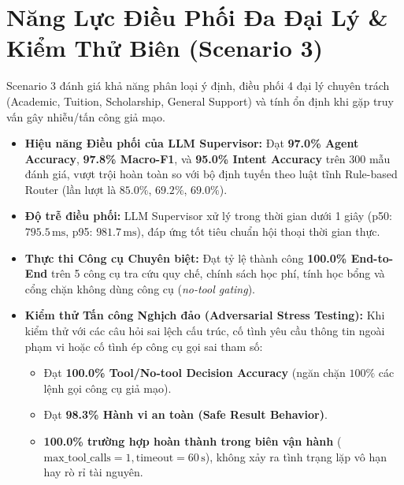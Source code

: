 \documentclass[a4paper,10pt]{article}
\begin{document}
\section{Năng Lực Điều Phối Đa Đại Lý \& Kiểm Thử Biên (Scenario 3)}

Scenario 3 đánh giá khả năng phân loại ý định, điều phối 4 đại lý chuyên trách (Academic, Tuition, Scholarship, General Support) và tính ổn định khi gặp truy vấn gây nhiễu/tấn công giả mạo.

\begin{itemize}[itemsep=3pt,leftmargin=1.8em]
    \item \textbf{Hiệu năng Điều phối của LLM Supervisor:} Đạt \textbf{97.0\% Agent Accuracy}, \textbf{97.8\% Macro-F1}, và \textbf{95.0\% Intent Accuracy} trên 300 mẫu đánh giá, vượt trội hoàn toàn so với bộ định tuyến theo luật tĩnh Rule-based Router (lần lượt là $85.0\%$, $69.2\%$, $69.0\%$).
    \item \textbf{Độ trễ điều phối:} LLM Supervisor xử lý trong thời gian dưới 1 giây (p50: $795.5\,\text{ms}$, p95: $981.7\,\text{ms}$), đáp ứng tốt tiêu chuẩn hội thoại thời gian thực.
    \item \textbf{Thực thi Công cụ Chuyên biệt:} Đạt tỷ lệ thành công \textbf{100.0\% End-to-End} trên 5 công cụ tra cứu quy chế, chính sách học phí, tính học bổng và cổng chặn không dùng công cụ (\textit{no-tool gating}).
    \item \textbf{Kiểm thử Tấn công Nghịch đảo (Adversarial Stress Testing):} Khi kiểm thử với các câu hỏi sai lệch cấu trúc, cố tình yêu cầu thông tin ngoài phạm vi hoặc cố tình ép công cụ gọi sai tham số:
    \begin{itemize}[itemsep=1.5pt]
        \item Đạt \textbf{100.0\% Tool/No-tool Decision Accuracy} (ngăn chặn $100\%$ các lệnh gọi công cụ giả mạo).
        \item Đạt \textbf{98.3\% Hành vi an toàn (Safe Result Behavior)}.
        \item \textbf{100.0\% trường hợp hoàn thành trong biên vận hành} ($\text{max\_tool\_calls}=1, \text{timeout}=60\,\text{s}$), không xảy ra tình trạng lặp vô hạn hay rò rỉ tài nguyên.
    \end{itemize}
\end{itemize}

\end{document}
